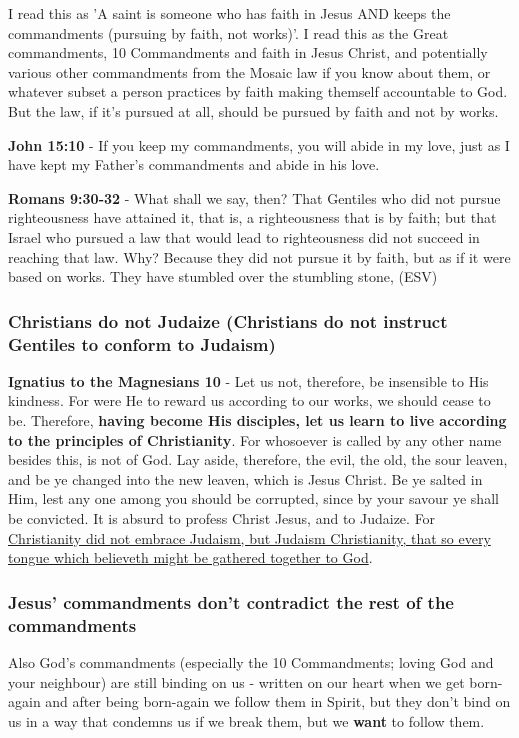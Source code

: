 \documentclass[11pt]{article}
\begin{document}
I read this as 'A saint is someone who has faith in Jesus AND keeps the commandments (pursuing by faith, not works)'.
I read this as the Great commandments, 10 Commandments and faith in Jesus Christ, and potentially various other commandments from the Mosaic law if you know about them, or whatever subset a person practices by faith making themself accountable to God.
But the law, if it's pursued at all, should be pursued by faith and not by works.

\textbf{John 15:10} - If you keep my commandments, you will abide in my love, just as I have kept my Father's commandments and abide in his love.

\textbf{Romans 9:30-32} - What shall we say, then? That Gentiles who did not pursue righteousness have attained it, that is, a righteousness that is by faith; but that Israel who pursued a law that would lead to righteousness did not succeed in reaching that law. Why? Because they did not pursue it by faith, but as if it were based on works. They have stumbled over the stumbling stone, (ESV)

\subsubsection{Christians do not Judaize (Christians do not instruct Gentiles to conform to Judaism)}
\label{sec:orgc5d31f7}
\textbf{Ignatius to the Magnesians 10} - Let us not, therefore, be insensible to His kindness. For were He to reward us according to our works, we should cease to be. Therefore, \textbf{having become His disciples, let us learn to live according to the principles of Christianity}. For whosoever is called by any other name besides this, is not of God. Lay aside, therefore, the evil, the old, the sour leaven, and be ye changed into the new leaven, which is Jesus Christ. Be ye salted in Him, lest any one among you should be corrupted, since by your savour ye shall be convicted. It is absurd to profess Christ Jesus, and to Judaize. For \uline{Christianity did not embrace Judaism, but Judaism Christianity, that so every tongue which believeth might be gathered together to God}.

\subsubsection{Jesus' commandments don't contradict the rest of the commandments}
\label{sec:org04085cc}
Also God's commandments (especially the 10 Commandments; loving God and your neighbour) are still binding on us - written on our heart when we get born-again and after being born-again we follow them in Spirit, but they don't bind on us in a way that condemns us if we  break them, but we \textbf{want} to follow them.
\end{document}
